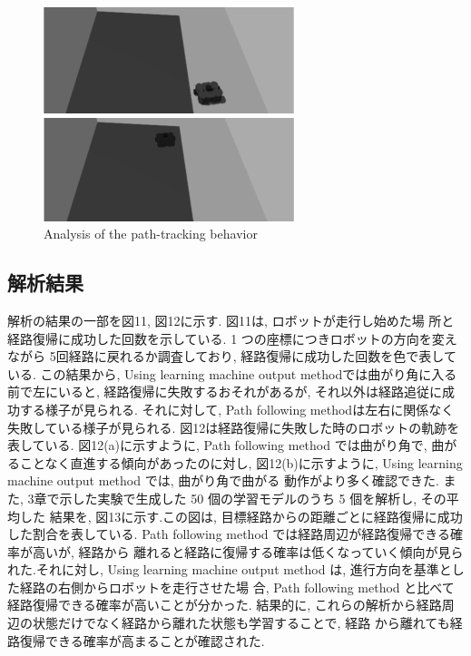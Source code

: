 \documentclass{jarticle}
\begin{document}
\begin{figure}[htbp]
\begin{minipage}[t]{0.5\linewidth}
  \end{minipage}\vspace*{2mm}
\vspace*{-2.5mm}
  \begin{minipage}[t]{0.5\linewidth}
    \centering
    \includegraphics[keepaspectratio, scale=0.32]{figs/init4.png}
  \end{minipage}
  \begin{minipage}[t]{0.5\linewidth}
    \centering
    \includegraphics[keepaspectratio, scale=0.33]{figs/return3.png}
  \end{minipage}\vspace*{4mm}
  \caption{Analysis of the path-tracking behavior}
\end{figure}


\subsection{解析結果}
解析の結果の一部を図11, 図12に示す. 図11は, ロボットが走行し始めた場
所と経路復帰に成功した回数を示している. 1 つの座標につきロボットの方向を変えながら
5回経路に戻れるか調査しており, 経路復帰に成功した回数を色で表している.
この結果から, Using learning machine output methodでは曲がり角に入る前で左にいると, 
経路復帰に失敗するおそれがあるが, それ以外は経路追従に成功する様子が見られる.
それに対して, Path following methodは左右に関係なく失敗している様子が見られる.
図12は経路復帰に失敗した時のロボットの軌跡を表している. 図12(a)に示すように,
Path following method では曲がり角で, 曲がることなく直進する傾向があったのに対し, 
図12(b)に示すように, Using learning machine output method では, 曲がり角で曲がる
動作がより多く確認できた.
また, 3章で示した実験で生成した 50 個の学習モデルのうち 5 個を解析し, その平均した
結果を, 図13に示す.この図は, 目標経路からの距離ごとに経路復帰に成功した割合を表している. 
Path following method では経路周辺が経路復帰できる確率が高いが, 経路から
離れると経路に復帰する確率は低くなっていく傾向が見られた.それに対し, Using learning
machine output method は, 進行方向を基準とした経路の右側からロボットを走行させた場
合, Path following method と比べて経路復帰できる確率が高いことが分かった.
結果的に, これらの解析から経路周辺の状態だけでなく経路から離れた状態も学習することで, 経路
から離れても経路復帰できる確率が高まることが確認された.
\end{document}
